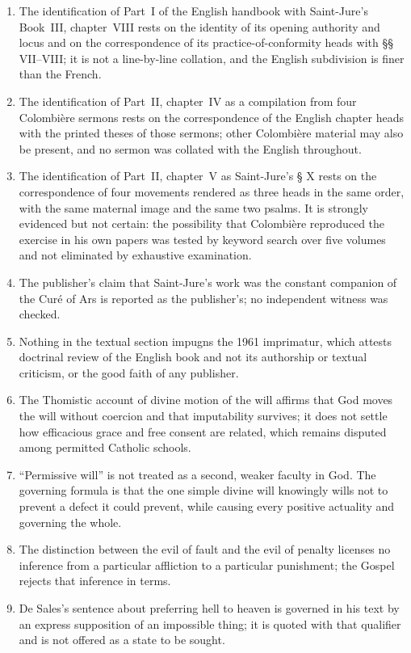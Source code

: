 \begin{enumerate}[leftmargin=1.45em,itemsep=0.25em]
\item The identification of Part~I of the English handbook with Saint-Jure's Book~III, chapter~VIII rests on the identity of its opening authority and locus and on the correspondence of its practice-of-conformity heads with §§ VII--VIII; it is not a line-by-line collation, and the English subdivision is finer than the French.
\item The identification of Part~II, chapter~IV as a compilation from four Colombière sermons rests on the correspondence of the English chapter heads with the printed theses of those sermons; other Colombière material may also be present, and no sermon was collated with the English throughout.
\item The identification of Part~II, chapter~V as Saint-Jure's § X rests on the correspondence of four movements rendered as three heads in the same order, with the same maternal image and the same two psalms. It is strongly evidenced but not certain: the possibility that Colombière reproduced the exercise in his own papers was tested by keyword search over five volumes and not eliminated by exhaustive examination.
\item The publisher's claim that Saint-Jure's work was the constant companion of the Curé of Ars is reported as the publisher's; no independent witness was checked.
\item Nothing in the textual section impugns the 1961 imprimatur, which attests doctrinal review of the English book and not its authorship or textual criticism, or the good faith of any publisher.
\item The Thomistic account of divine motion of the will affirms that God moves the will without coercion and that imputability survives; it does not settle how efficacious grace and free consent are related, which remains disputed among permitted Catholic schools.
\item ``Permissive will'' is not treated as a second, weaker faculty in God. The governing formula is that the one simple divine will knowingly wills not to prevent a defect it could prevent, while causing every positive actuality and governing the whole.
\item The distinction between the evil of fault and the evil of penalty licenses no inference from a particular affliction to a particular punishment; the Gospel rejects that inference in terms.
\item De Sales's sentence about preferring hell to heaven is governed in his text by an express supposition of an impossible thing; it is quoted with that qualifier and is not offered as a state to be sought.

\end{enumerate}
